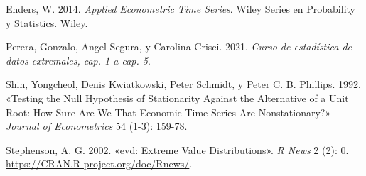 \documentclass[
  oneside]{article}
\newlength{\cslhangindent}
\newlength{\cslentryspacingunit} %
\newenvironment{CSLReferences}[2] %
 {%
  \setlength{\parindent}{0pt}
  \ifodd #1
  \let\oldpar\par
  \def\par{\hangindent=\cslhangindent\oldpar}
  \fi
  \setlength{\parskip}{#2\cslentryspacingunit}
 }%
 {}
\begin{document}
\hypertarget{refs}{}
\begin{CSLReferences}{1}{0}
\leavevmode{}%
Enders, W. 2014. \emph{Applied Econometric Time Series}. Wiley Series en
Probability y Statistics. Wiley.

\leavevmode{}%
Perera, Gonzalo, Angel Segura, y Carolina Crisci. 2021. \emph{Curso de
estadística de datos extremales, cap. 1 a cap. 5}.

\leavevmode{}%
Shin, Yongcheol, Denis Kwiatkowski, Peter Schmidt, y Peter C. B.
Phillips. 1992. {«Testing the Null Hypothesis of Stationarity Against
the Alternative of a Unit Root: How Sure Are We That Economic Time
Series Are Nonstationary?»} \emph{Journal of Econometrics} 54 (1-3):
159-78.

\leavevmode{}%
Stephenson, A. G. 2002. {«evd: Extreme Value Distributions»}. \emph{R
News} 2 (2): 0. \url{https://CRAN.R-project.org/doc/Rnews/}.

\end{CSLReferences}
\end{document}
